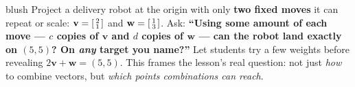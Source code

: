 \documentclass[10pt]{article}
\newcommand{\vv}{\mathbf{v}}
\newcommand{\ww}{\mathbf{w}}
\begin{document}
\begin{skillbox}[Hook]{blush}
    Project a delivery robot at the origin with only \textbf{two fixed moves} it can repeat or
    scale: $\vv=\begin{bsmallmatrix} 2\\1 \end{bsmallmatrix}$ and
    $\ww=\begin{bsmallmatrix} 1\\3 \end{bsmallmatrix}$. Ask: \textbf{``Using some amount of
    each move --- $c$ copies of $\vv$ and $d$ copies of $\ww$ --- can the robot land exactly on
    $(5,5)$? On \emph{any} target you name?''} Let students try a few weights before revealing
    $2\vv+\ww=(5,5)$. This frames the lesson's real question: not just \emph{how} to combine
    vectors, but \emph{which points combinations can reach}.
\end{skillbox}
\end{document}
